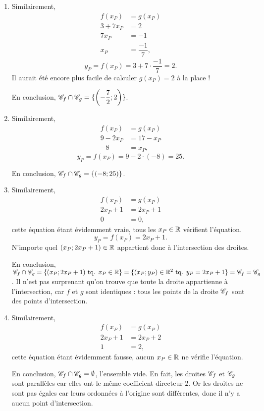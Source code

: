 {\begin{enumerate}
		\item 
			Similairement,
			\begin{align*}
				f(x_P) &= g(x_P) \\
				3 + 7x_P & = 2 \\
				7x_P &= -1 \\
				x_P &= \dfrac{-1}7,
			\end{align*}
			\[
				y_P = f(x_P) = 3+7\cdot \dfrac{-1}7  = 2.
			\]
			Il aurait été encore plus facile de calculer $g(x_P) = 2$ à la place !
			
			En conclusion, $\mathcal{C}_f \cap \mathcal{C}_g = \{ \left(-\dfrac72 ; 2\right) \}$.
		
		\item
			Similairement,
			\begin{align*}
				f(x_P) &= g(x_P) \\
				9-2x_P & = 17-x_P \\
				-8 &= x_P,
			\end{align*}
			\[
				y_P = f(x_P) = 9-2 \cdot(-8) = 25.
			\]
		
			En conclusion, $\mathcal{C}_f \cap \mathcal{C}_g = \{ (-8;25) \}$.
		
		\item 			
		Similairement,
			\begin{align*}
				f(x_P) &= g(x_P) \\
				2x_P + 1 & = 2x_P + 1 \\
				0 &= 0,
			\end{align*}
			cette équation étant évidemment vraie, tous les $x_P \in \mathbb{R}$ vérifient l'équation.
			\[
				y_P = f(x_P) = 2x_P + 1.
			\]
			N'importe quel $(x_P ; 2x_P+1) \in \mathbb{R}$ appartient donc à l'intersection des droites.
			
			En conclusion, $\mathcal{C}_f \cap \mathcal{C}_g = \{ (x_P ; 2x_P+1) \text{ tq. } x_P \in \mathbb{R} \} = \{ (x_P ; y_P) \in \mathbb{R}^2 \text{ tq. } y_P = 2x_P + 1 \} = \mathcal{C}_f = \mathcal{C}_g$.
			Il n'est pas surprenant qu'on trouve que toute la droite appartienne à l'intersection, car $f$ et $g$ sont identiques : tous les points de la droite $\mathcal{C}_f$ sont des points d'intersection.
		
		
		\item 
			Similairement,
			\begin{align*}
				f(x_P) &= g(x_P) \\
				2x_P + 1 & = 2x_P + 2 \\
				1 &= 2,
			\end{align*}
			cette équation étant évidemment fausse, aucun $x_P \in \mathbb{R}$ ne vérifie l'équation.
			
			En conclusion, $\mathcal{C}_f \cap \mathcal{C}_g = \emptyset$, l'ensemble vide.
			En fait, les droites $\mathcal{C}_f$ et $\mathcal{C}_g$ sont parallèles car elles ont le même coefficient directeur $2$.
			Or les droites ne sont pas égales car leurs ordonnées à l'origine sont différentes, donc il n'y a aucun point d'intersection.
	\end{enumerate}

}

